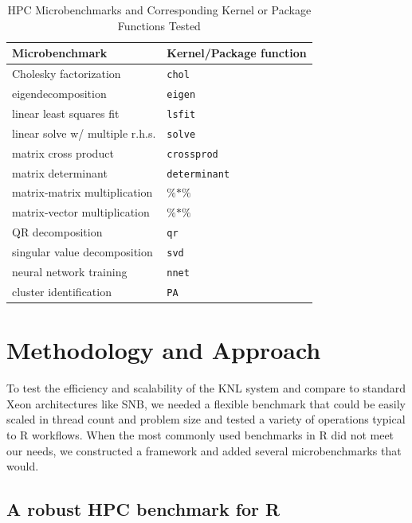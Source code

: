\begin{table}
  \caption{HPC Microbenchmarks and Corresponding Kernel or Package Functions Tested}
  \label{tab:microbenchmarks}
  \begin{tabular}{ll}
    \toprule
    Microbenchmark & Kernel/Package function \\
    \midrule
    Cholesky factorization       & \texttt{chol} \\
    eigendecomposition           & \texttt{eigen} \\
    linear least squares fit     & \texttt{lsfit} \\
    linear solve w/ multiple r.h.s. & \texttt{solve} \\
    matrix cross product         & \texttt{crossprod} \\
    matrix determinant           & \texttt{determinant} \\
    matrix-matrix multiplication & $\%$$*$$\%$ \\
    matrix-vector multiplication & $\%$$*$$\%$ \\
    QR decomposition             & \texttt{qr} \\
    singular value decomposition & \texttt{svd} \\
    neural network training      & \texttt{nnet} \\
    cluster identification       & \texttt{PA} \\
    \bottomrule
  \end{tabular}
\end{table}

\section{Methodology and Approach}\label{sec:methodology}

To test the efficiency and scalability of the KNL system and compare to standard Xeon
architectures like SNB, we needed a flexible benchmark that could be easily scaled in
thread count and problem size and tested a variety of operations typical to R workflows.
When the most commonly used benchmarks in R did not meet our needs, we constructed a
framework and added several microbenchmarks that would.

\subsection{A robust HPC benchmark for R} \label{sec:hpcBenchmark}

